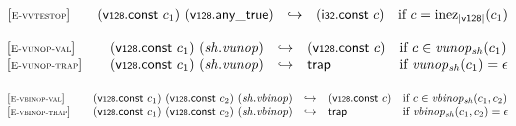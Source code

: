\vspace{1ex}

$$
\begin{array}[t]{@{}lrcl@{}l@{}}
{[\textsc{\scriptsize E{-}vvtestop}]} \quad & (\mathsf{v{\scriptstyle 128}}{.}\mathsf{const}~c_1)~(\mathsf{v{\scriptstyle 128}} {.} \mathsf{any\_true}) & \hookrightarrow & (\mathsf{i{\scriptstyle 32}}{.}\mathsf{const}~c) & \quad \mbox{if}~ c = {{\mathrm{inez}}}_{{|\mathsf{v{\scriptstyle 128}}|}}(c_1) \\
\end{array}
$$

\vspace{1ex}

$$
\begin{array}[t]{@{}lrcl@{}l@{}}
{[\textsc{\scriptsize E{-}vunop{-}val}]} \quad & (\mathsf{v{\scriptstyle 128}}{.}\mathsf{const}~c_1)~({\mathit{sh}} {.} {\mathit{vunop}}) & \hookrightarrow & (\mathsf{v{\scriptstyle 128}}{.}\mathsf{const}~c) & \quad \mbox{if}~ c \in {{\mathit{vunop}}}{{}_{{\mathit{sh}}}(c_1)} \\
{[\textsc{\scriptsize E{-}vunop{-}trap}]} \quad & (\mathsf{v{\scriptstyle 128}}{.}\mathsf{const}~c_1)~({\mathit{sh}} {.} {\mathit{vunop}}) & \hookrightarrow & \mathsf{trap} & \quad \mbox{if}~ {{\mathit{vunop}}}{{}_{{\mathit{sh}}}(c_1)} = \epsilon \\
\end{array}
$$

\vspace{1ex}

$$
\begin{array}[t]{@{}lrcl@{}l@{}}
{[\textsc{\scriptsize E{-}vbinop{-}val}]} \quad & (\mathsf{v{\scriptstyle 128}}{.}\mathsf{const}~c_1)~(\mathsf{v{\scriptstyle 128}}{.}\mathsf{const}~c_2)~({\mathit{sh}} {.} {\mathit{vbinop}}) & \hookrightarrow & (\mathsf{v{\scriptstyle 128}}{.}\mathsf{const}~c) & \quad \mbox{if}~ c \in {{\mathit{vbinop}}}{{}_{{\mathit{sh}}}(c_1, c_2)} \\
{[\textsc{\scriptsize E{-}vbinop{-}trap}]} \quad & (\mathsf{v{\scriptstyle 128}}{.}\mathsf{const}~c_1)~(\mathsf{v{\scriptstyle 128}}{.}\mathsf{const}~c_2)~({\mathit{sh}} {.} {\mathit{vbinop}}) & \hookrightarrow & \mathsf{trap} & \quad \mbox{if}~ {{\mathit{vbinop}}}{{}_{{\mathit{sh}}}(c_1, c_2)} = \epsilon \\
\end{array}
$$

\vspace{1ex}

